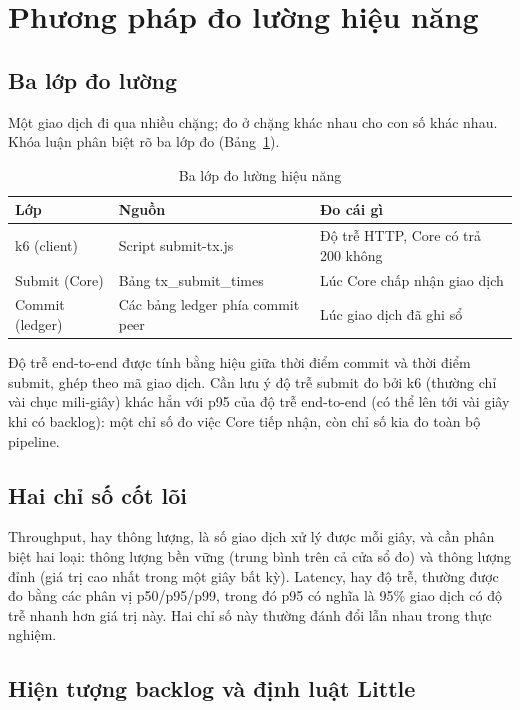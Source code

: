 \section{Phương pháp đo lường hiệu năng}
\label{sec:measurement}

\subsection{Ba lớp đo lường}

Một giao dịch đi qua nhiều chặng; đo ở chặng khác nhau cho con số khác nhau.
Khóa luận phân biệt rõ ba lớp đo (Bảng~\ref{tab:three-layers}).

\begin{table}[H]
\centering
\caption{Ba lớp đo lường hiệu năng}
\label{tab:three-layers}
\begin{tabular}{@{}p{2.6cm}p{4.2cm}p{5cm}@{}}
\toprule
Lớp & Nguồn & Đo cái gì \\
\midrule
k6 (client) & Script submit-tx.js & Độ trễ HTTP, Core có trả 200 không \\
Submit (Core) & Bảng tx\_submit\_times & Lúc Core chấp nhận giao dịch \\
Commit (ledger) & Các bảng ledger phía commit peer & Lúc giao dịch đã ghi sổ \\
\bottomrule
\end{tabular}
\end{table}

Độ trễ end-to-end được tính bằng hiệu giữa thời điểm commit và thời điểm
submit, ghép theo mã giao dịch. Cần lưu ý độ trễ submit đo bởi k6 (thường chỉ
vài chục mili-giây) khác hẳn với p95 của độ trễ end-to-end (có thể lên tới
vài giây khi có backlog): một chỉ số đo việc Core tiếp nhận, còn chỉ số kia
đo toàn bộ pipeline.

\subsection{Hai chỉ số cốt lõi}

Throughput, hay thông lượng, là số giao dịch xử lý được mỗi giây, và cần
phân biệt hai loại: thông lượng bền vững (trung bình trên cả cửa sổ đo) và
thông lượng đỉnh (giá trị cao nhất trong một giây bất kỳ). Latency, hay độ
trễ, thường được đo bằng các phân vị p50/p95/p99, trong đó p95 có nghĩa là
95\% giao dịch có độ trễ nhanh hơn giá trị này. Hai chỉ số này thường đánh
đổi lẫn nhau trong thực nghiệm.

\subsection{Hiện tượng backlog và định luật Little}

